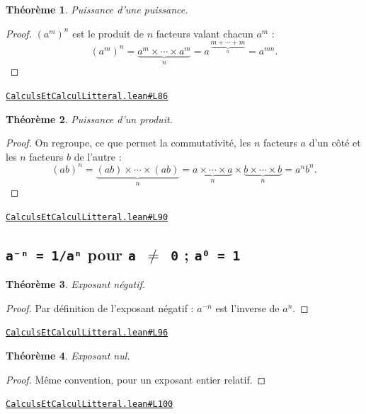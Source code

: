 \documentclass[11pt,a4paper]{article}
\theoremstyle{definition}
\theoremstyle{plain}
\newtheorem{theoreme}{Théorème}
\newcommand{\source}[2]{\par\smallskip\noindent\hfill{\footnotesize\href{#1}{\texttt{#2}}}\par\smallskip}
\begin{document}
\begin{theoreme}
Puissance d'une puissance.
\end{theoreme}

\begin{proof}
$(a^m)^n$ est le produit de $n$ facteurs valant chacun $a^m$ :
\[
(a^m)^n = \underbrace{a^m \times \cdots \times a^m}_{n}
        = a^{\,\underbrace{\scriptstyle m + \cdots + m}_{n}} = a^{mn} .
\]
\end{proof}
\source{https://github.com/Commutator-IO/learn-lean/blob/main/cours/01-college/01-nombres-et-calculs/CalculsEtCalculLitteral.lean\#L86}{CalculsEtCalculLitteral.lean\#L86}

\begin{theoreme}
Puissance d'un produit.
\end{theoreme}

\begin{proof}
On regroupe, ce que permet la commutativité, les $n$ facteurs $a$ d'un côté et les $n$
facteurs $b$ de l'autre :
\[
(ab)^n = \underbrace{(ab) \times \cdots \times (ab)}_{n}
       = \underbrace{a \times \cdots \times a}_{n} \times
         \underbrace{b \times \cdots \times b}_{n}
       = a^n b^n .
\]
\end{proof}
\source{https://github.com/Commutator-IO/learn-lean/blob/main/cours/01-college/01-nombres-et-calculs/CalculsEtCalculLitteral.lean\#L90}{CalculsEtCalculLitteral.lean\#L90}

\subsection{\texttt{a⁻ⁿ = 1/aⁿ} pour \texttt{a \(\ne\) 0} ; \texttt{a⁰ = 1}}

\begin{theoreme}
Exposant négatif.
\end{theoreme}

\begin{proof}
Par définition de l'exposant négatif : $a^{-n}$ est l'inverse de $a^n$.
\end{proof}
\source{https://github.com/Commutator-IO/learn-lean/blob/main/cours/01-college/01-nombres-et-calculs/CalculsEtCalculLitteral.lean\#L96}{CalculsEtCalculLitteral.lean\#L96}

\begin{theoreme}
Exposant nul.
\end{theoreme}

\begin{proof}
Même convention, pour un exposant entier relatif.
\end{proof}
\source{https://github.com/Commutator-IO/learn-lean/blob/main/cours/01-college/01-nombres-et-calculs/CalculsEtCalculLitteral.lean\#L100}{CalculsEtCalculLitteral.lean\#L100}
\end{document}

